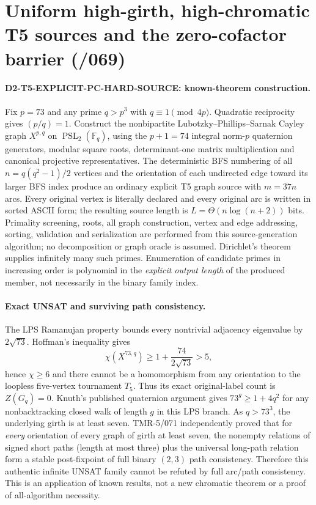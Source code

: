 \documentclass[11pt]{article}
\begin{document}
\section{Uniform high-girth, high-chromatic T5 sources and the zero-cofactor barrier (/069)}
\paragraph{D2-T5-EXPLICIT-PC-HARD-SOURCE: known-theorem construction.}
Fix $p=73$ and any prime $q>p^3$ with $q\equiv1\pmod{4p}$.
Quadratic reciprocity gives $(p/q)=1$. Construct the nonbipartite
Lubotzky--Phillips--Sarnak Cayley graph $X^{p,q}$ on
$\operatorname{PSL}_2(\mathbb F_q)$, using the $p+1=74$
integral norm-$p$ quaternion generators, modular square
roots, determinant-one matrix multiplication and canonical
projective representatives. The deterministic BFS numbering
of all $n=q(q^2-1)/2$ vertices and the orientation of
each undirected edge toward its larger BFS index produce
an ordinary explicit T5 graph source with $m=37n$ arcs.
Every original vertex is literally declared and every
original arc is written in sorted ASCII form; the resulting
source length is $L=\Theta(n\log(n+2))$ bits.
Primality screening, roots, all graph construction,
vertex and edge addressing, sorting, validation and
serialization are performed from this source-generation
algorithm; no decomposition or graph oracle is assumed.
Dirichlet's theorem supplies infinitely many such primes.
Enumeration of candidate primes in increasing order is
polynomial in the \emph{explicit output length} of the
produced member, not necessarily in the binary family index.

\paragraph{Exact UNSAT and surviving path consistency.}
The LPS Ramanujan property bounds every nontrivial
adjacency eigenvalue by $2\sqrt{73}$. Hoffman's
inequality gives
\[
  \chi(X^{73,q})\ge
  1+\frac{74}{2\sqrt{73}}>5,
\]
hence $\chi\ge6$ and there cannot be a homomorphism
from any orientation to the loopless five-vertex
tournament $T_5$. Thus its exact original-label count
is $Z(G_q)=0$. Knuth's published quaternion argument
gives $73^g\ge1+4q^2$ for any nonbacktracking
closed walk of length $g$ in this LPS branch.
As $q>73^3$, the underlying girth is at least seven.
TMR-5/071 independently proved that for \emph{every}
orientation of every graph of girth at least seven,
the nonempty relations of signed short paths (length
at most three) plus the universal long-path relation
form a stable post-fixpoint of full binary
$(2,3)$ path consistency. Therefore this authentic
infinite UNSAT family cannot be refuted by full
arc/path consistency. This is an application of
known results, not a new chromatic theorem or a proof
of all-algorithm necessity.
\end{document}
